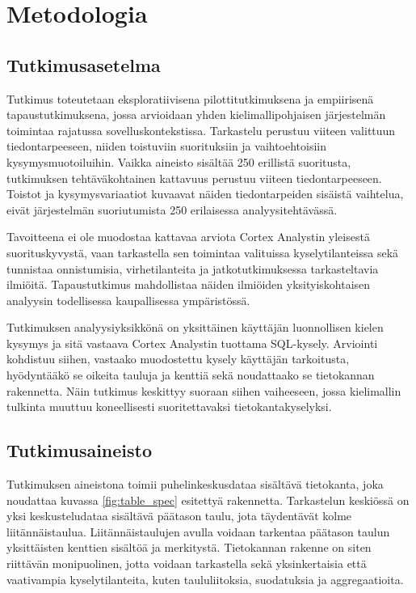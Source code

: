 \section{Metodologia}\label{sec:methodology}

\subsection{Tutkimusasetelma}
Tutkimus toteutetaan eksploratiivisena pilottitutkimuksena ja
empiirisenä tapaustutkimuksena, jossa arvioidaan yhden
kielimallipohjaisen järjestelmän toimintaa rajatussa
sovelluskontekstissa. Tarkastelu perustuu viiteen valittuun
tiedontarpeeseen, niiden toistuviin suorituksiin ja
vaihtoehtoisiin kysymysmuotoiluihin. Vaikka aineisto sisältää
250 erillistä suoritusta, tutkimuksen tehtäväkohtainen
kattavuus perustuu viiteen tiedontarpeeseen. Toistot ja
kysymysvariaatiot kuvaavat näiden tiedontarpeiden sisäistä
vaihtelua, eivät järjestelmän suoriutumista 250 erilaisessa
analyysitehtävässä.

Tavoitteena ei ole muodostaa kattavaa arviota Cortex Analystin
yleisestä suorituskyvystä, vaan tarkastella sen toimintaa
valituissa kyselytilanteissa sekä tunnistaa onnistumisia,
virhetilanteita ja jatkotutkimuksessa tarkasteltavia ilmiöitä.
Tapaustutkimus mahdollistaa näiden ilmiöiden yksityiskohtaisen
analyysin todellisessa kaupallisessa ympäristössä.

Tutkimuksen analyysiyksikkönä on yksittäinen käyttäjän luonnollisen kielen kysymys ja sitä vastaava Cortex Analystin tuottama SQL-kysely. Arviointi kohdistuu siihen, vastaako muodostettu kysely käyttäjän tarkoitusta, hyödyntääkö se oikeita tauluja ja kenttiä sekä noudattaako se tietokannan rakennetta. Näin tutkimus keskittyy suoraan siihen vaiheeseen, jossa kielimallin tulkinta muuttuu koneellisesti suoritettavaksi tietokantakyselyksi.

\subsection{Tutkimusaineisto}
Tutkimuksen aineistona toimii puhelinkeskusdataa sisältävä tietokanta, joka noudattaa kuvassa \ref{fig:table_spec} esitettyä rakennetta. Tarkastelun keskiössä on yksi keskusteludataa sisältävä päätason taulu, jota täydentävät kolme liitännäistaulua. Liitännäistaulujen avulla voidaan tarkentaa päätason taulun yksittäisten kenttien sisältöä ja merkitystä. Tietokannan rakenne on siten riittävän monipuolinen, jotta voidaan tarkastella sekä yksinkertaisia että vaativampia kyselytilanteita, kuten taululiitoksia, suodatuksia ja aggregaatioita.

